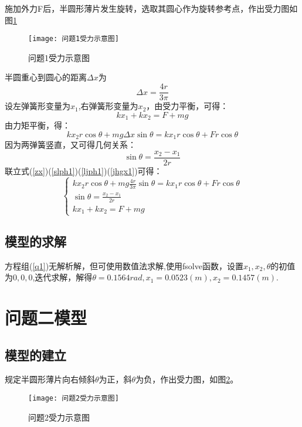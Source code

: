 \documentclass[withoutpreface,bwprint]{cumcmthesis} %
\begin{document}
	施加外力F后，半圆形薄片发生旋转，选取其圆心作为旋转参考点，作出受力图如图\ref{问题1受力示意图}
	 \begin{figure}[H]
		\centering
		\texttt{[image: 问题1受力示意图]}
		\caption{问题1受力示意图}
		\label{问题1受力示意图}
	\end{figure}
	半圆重心到圆心的距离$\Delta x $为
	\begin{equation}
		\Delta x = \frac{4 r}{3 \pi} 
		\label{zx}
	\end{equation}	
	设左弹簧形变量为$x_1$,右弹簧形变量为$x_2$，由受力平衡，可得：
	\begin{equation}
	k x_{1}+k x_{2}=F+m g
	\label{slph1}
	\end{equation}	
	由力矩平衡，得：
	\begin{equation}
	k x_{2} r \cos \theta+m g \Delta x \sin \theta=k x_{1} r \cos \theta+F r \cos \theta
	\label{ljph1}
	\end{equation}
	因为两弹簧竖直，又可得几何关系：
	\begin{equation}
	\sin \theta=\frac{x_{2}-x_{1}}{2 r} 
	\label{jhgx1}
	\end{equation}
	联立式(\ref{zx})(\ref{slph1})(\ref{ljph1})(\ref{jhgx1})可得：
	\begin{equation}
	\left\{\begin{array}{l}
	k x_{2} r \cos \theta+m g \frac{4 r}{3\pi} \sin \theta=k x_{1} r \cos \theta+F r \cos \theta\\
	\sin \theta=\frac{x_{2}-x_{1}}{2 r} \\
	k x_{1}+k x_{2}=F+m g
	\end{array}\right.
	\label{q1}
	\end{equation}
	
	
	
	\subsection{模型的求解}
	方程组(\ref{q1})无解析解，但可使用数值法求解,使用fsolve函数，设置$x_1,x_2,\theta$的初值为$0,0,0$,迭代求解，解得$\theta=0.1564rad,x_1=0.0523 (m),x_2=0.1457(m)$.

	
	\section{问题二模型}
	\subsection{模型的建立}
	规定半圆形薄片向右倾斜$\theta$为正，斜$\theta$为负，作出受力图，如图\ref{问题2受力示意图}。
	 \begin{figure}[H]
		\centering
		\texttt{[image: 问题2受力示意图]}
		\caption{问题2受力示意图}
		\label{问题2受力示意图}
	\end{figure}
	
\end{document}
